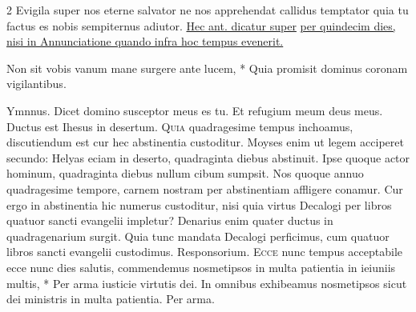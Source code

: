 \begin{multicols*}{2}
 Evigila super nos eterne salvator ne nos apprehendat callidus temptator quia tu factus es nobis sempiternus adiutor.
\newline \ul{Hec ant. dicatur super}  \ul{per quindecim dies, nisi in Annunciatione quando infra hoc tempus evenerit.}
\begin{invitatory}
{Non sit vobis vanum mane surgere ante lucem, * Quia promisit dominus coronam vigilantibus.}
\end{invitatory}
{\color{Red} Ymnnus.}
 \V Dicet domino susceptor meus es tu. \R Et refugium meum deus meus.
 Ductus est Ihesus in desertum.
\lettrine[lines=2]{\zallmancaps \color{Blue} Q}{uia} quadragesime tempus inchoamus, discutiendum est cur hec abstinentia custoditur. Moyses enim ut legem acciperet secundo: Helyas eciam in deserto, quadraginta diebus abstinuit. Ipse quoque actor hominum, quadraginta diebus nullum cibum sumpsit. Nos quoque annuo quadragesime tempore, carnem nostram per abstinentiam affligere conamur. Cur ergo in abstinentia hic numerus custoditur, nisi quia virtus Decalogi per libros quatuor sancti evangelii impletur? Denarius enim quater ductus in quadragenarium surgit. Quia tunc mandata Decalogi perficimus, cum quatuor libros sancti evangelii custodimus.
{\color{Red} Responsorium.}
\lettrine[lines=2]{\zallmancaps \color{Red} E}{cce} \hypertarget{ecce-nunc}{\label{ecce-nunc}} nunc tempus acceptabile ecce nunc dies salutis, commendemus nosmetipsos in multa patientia in ieiuniis multis, * Per arma iusticie virtutis dei. \V In omnibus exhibeamus nosmetipsos sicut dei ministris in multa patientia. Per arma.

\end{multicols*}
